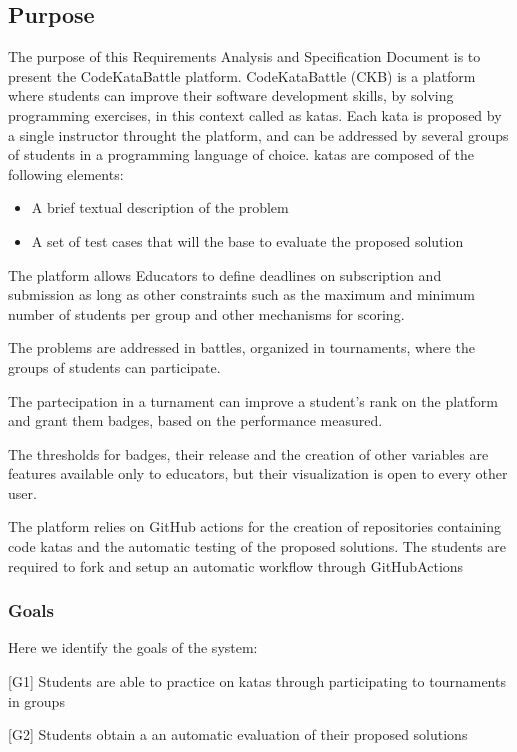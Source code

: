 \subsection{Purpose}

The purpose of this Requirements Analysis and Specification Document is to present the CodeKataBattle platform. CodeKataBattle (CKB) is a platform where students can improve their software development skills, by solving programming exercises, in this context called as katas.
Each kata is proposed by a single instructor throught the platform, and can be addressed by several groups of students in a programming language of choice.
katas are composed of the following elements:
\begin{itemize}
    \item A brief textual description of the problem
    \item A set of test cases that will the base to evaluate the proposed solution
\end{itemize}


The platform allows Educators to define deadlines on subscription and submission as long as other constraints such as the maximum and minimum number of students per group and other mechanisms for scoring. 

The problems are addressed in battles, organized in tournaments, where the groups of students can participate. 

The partecipation in a turnament can improve a student's rank on the platform and grant them badges, based on the performance measured.

The thresholds for badges, their release and the creation of other variables are features available only to educators, but their visualization is open to every other user.

The platform relies on GitHub actions for the creation of repositories containing code katas and the automatic testing of the proposed solutions. The students are required to fork and setup an automatic workflow through GitHubActions

\subsubsection{Goals}
Here we identify the goals of the system:

[G1] Students are able to practice on katas through participating to tournaments in groups

[G2] Students obtain a an automatic evaluation of their proposed solutions

